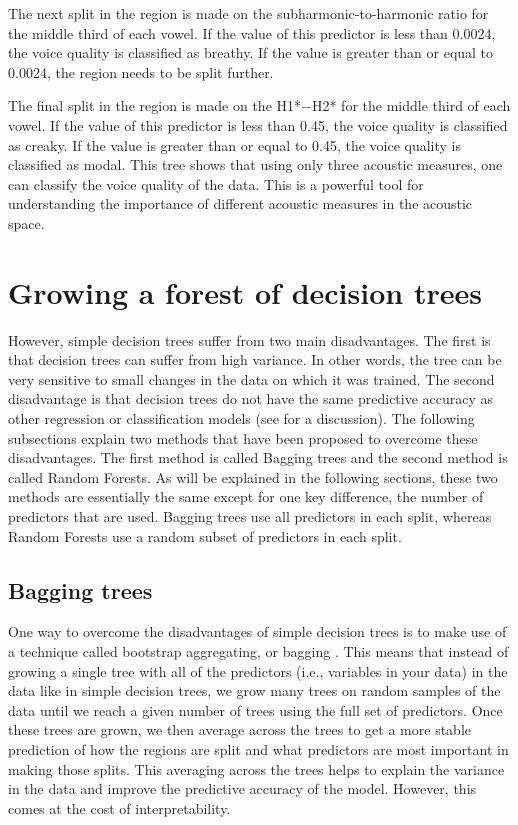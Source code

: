 The next split in the region is made on the subharmonic-to-harmonic ratio for the middle third of each vowel. If the value of this predictor is less than 0.0024, the voice quality is classified as breathy. If the value is greater than or equal to 0.0024, the region needs to be split further.

The final split in the region is made on the H1*$-$H2* for the middle third of each vowel. If the value of this predictor is less than 0.45, the voice quality is classified as creaky. If the value is greater than or equal to 0.45, the voice quality is classified as modal. This tree shows that using only three acoustic measures, one can classify the voice quality of the data. This is a powerful tool for understanding the importance of different acoustic measures in the acoustic space. 

\section{Growing a forest of decision trees} \label{sec:growing_forest}

However, simple decision trees suffer from two main disadvantages. The first is that decision trees can suffer from high variance. In other words, the tree can be very sensitive to small changes in the data on which it was trained. The second disadvantage is that decision trees do not have the same predictive accuracy as other regression or classification models (see \cite{hastieElementsStatisticalLearning2009} for a discussion). The following subsections explain two methods that have been proposed to overcome these disadvantages. The first method is called Bagging trees and the second method is called Random Forests. As will be explained in the following sections, these two methods are essentially the same except for one key difference, the number of predictors that are used. Bagging trees use all predictors in each split, whereas Random Forests use a random subset of predictors in each split. 

\subsection{Bagging trees} \label{sec:bagging_bagging}
One way to overcome the disadvantages of simple decision trees is to make use of a technique called bootstrap aggregating, or bagging \citep{breimanBaggingPredictors1996}. This means that instead of growing a single tree with all of the predictors (i.e., variables in your data) in the data like in simple decision trees, we grow many trees on random samples of the data until we reach a given number of trees using the full set of predictors. Once these trees are grown, we then average across the trees to get a more stable prediction of how the regions are split and what predictors are most important in making those splits. This averaging across the trees helps to explain the variance in the data and improve the predictive accuracy of the model. However, this comes at the cost of interpretability. 

